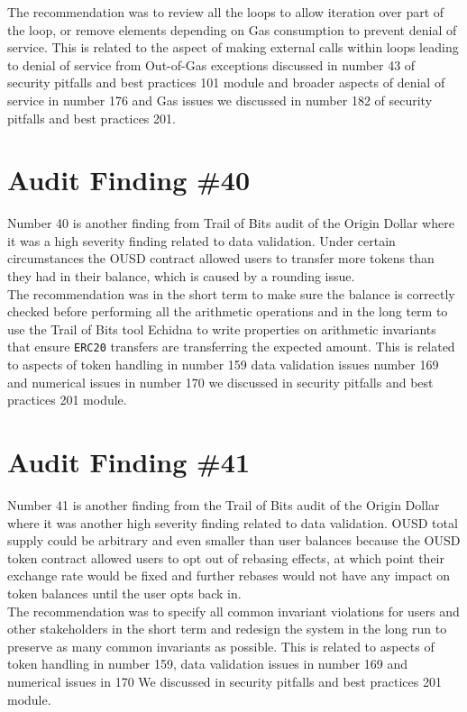 The recommendation was to review all the loops to allow iteration over part of the loop, or remove elements depending on Gas consumption to prevent denial of service. This is related to the aspect of making external calls within loops leading to denial of service from Out-of-Gas exceptions discussed in number 43 of security pitfalls and best practices 101 module and broader aspects of denial of service in number 176 and Gas issues we discussed in number 182 of security pitfalls and best practices 201.

\section{Audit Finding \#40}

Number 40 is another finding from Trail of Bits audit of the Origin Dollar where it was a high severity finding related to data validation. Under certain circumstances the OUSD contract allowed users to transfer more tokens than they had in their balance, which is caused by a rounding issue.\\

The recommendation was in the short term to make sure the balance is correctly checked before performing all the arithmetic operations and in the long term to use the Trail of Bits tool Echidna to write properties on arithmetic invariants that ensure \verb|ERC20| transfers are transferring the expected amount. This is related to aspects of token handling in number 159 data validation issues number 169 and numerical issues in number 170 we discussed in security pitfalls and best practices 201 module.

\section{Audit Finding \#41}

Number 41 is another finding from the Trail of Bits audit of the Origin Dollar where it was another high severity finding related to data validation. OUSD total supply could be arbitrary and even smaller than user balances because the OUSD token contract allowed users to opt out of rebasing effects, at which point their exchange rate would be fixed and further rebases would not have any impact on token balances until the user opts back in.\\

The recommendation was to specify all common invariant violations for users and other stakeholders in the short term and redesign the system in the long run to preserve as many common invariants as possible. This is related to aspects of token handling in number 159, data validation issues in number 169 and numerical issues in 170 We discussed in security pitfalls and best practices 201 module.

